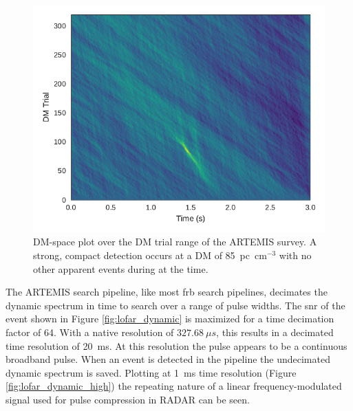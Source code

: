 \documentclass[a4paper,fleqn,usenatbib]{mnras}
\begin{document}
\begin{figure}
    \includegraphics[width=1.0\linewidth]{figures/LOFAR_dm_time.pdf}
    \caption{DM-space plot over the DM trial range of the ARTEMIS survey. A
    strong, compact detection occurs at a DM of 85~pc~cm$^{-3}$ with no other
    apparent events during at the time.
    }
    \label{fig:lofar_dm_time}
\end{figure}

The ARTEMIS search pipeline, like most \gls{frb} search pipelines, decimates the
dynamic spectrum in time to search over a range of pulse widths. The \gls{snr}
of the event shown in Figure \ref{fig:lofar_dynamic} is maximized for a time
decimation factor of 64. With a native resolution of $327.68~\mu s$, this
results in a decimated time resolution of 20~ms. At this resolution the pulse
appears to be a continuous broadband pulse. When an event is detected in the
pipeline the undecimated dynamic spectrum is saved. Plotting at 1~ms time
resolution (Figure \ref{fig:lofar_dynamic_high}) the repeating nature of a
linear frequency-modulated signal used for pulse compression in RADAR can be
seen.
\end{document}
